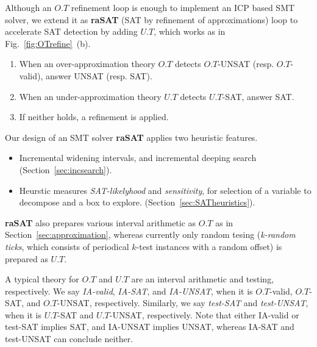 Although an $O.T$ refinement loop is enough to implement an ICP based SMT solver, 
we extend it as {\bf raSAT} (SAT by refinement of approximations) loop to accelerate SAT detection 
by adding $U.T$, which works as in Fig.~\ref{fig:OTrefine}~(b). 
\begin{enumerate}
\item When an over-approximation theory $O.T$ detects $O.T$-UNSAT (resp. $O.T$-valid), 
answer UNSAT (resp. SAT). 
\item When an under-approximation theory $U.T$ detects $U.T$-SAT, answer SAT. 
\item If neither holds, a refinement is applied. 
\end{enumerate}

Our design of an SMT solver {\bf raSAT} applies two heuristic features. 
\begin{itemize}
\item Incremental widening intervals, and incremental deeping search 
(Section~\ref{sec:incsearch}). 
\item 
Heurstic measures {\em SAT-likelyhood} and {\em sensitivity}, 
for selection of a variable to decompose and a box to explore. 
(Section~\ref{sec:SATheuristics}). 
\end{itemize} 

{\bf raSAT} also prepares various interval arithmetic as $O.T$ as in Section~\ref{sec:approximation}, 
whereas currently only random tesing (\emph{k-random ticks}, 
which consists of periodical $k$-test instances with a random offset) is prepared as $U.T$. 

A typical theory for $O.T$ and $U.T$ are an interval arithmetic and testing, respectively. 
We say {\em IA-valid}, {\em IA-SAT}, and {\em IA-UNSAT}, when it is $O.T$-valid, $O.T$-SAT, and 
$O.T$-UNSAT, respectively. 
Similarly, we say {\em test-SAT} and {\em test-UNSAT}, when it is $U.T$-SAT and $U.T$-UNSAT, respectively. 
Note that either IA-valid or test-SAT implies SAT, and IA-UNSAT implies UNSAT, 
whereas IA-SAT and test-UNSAT can conclude neither. 


